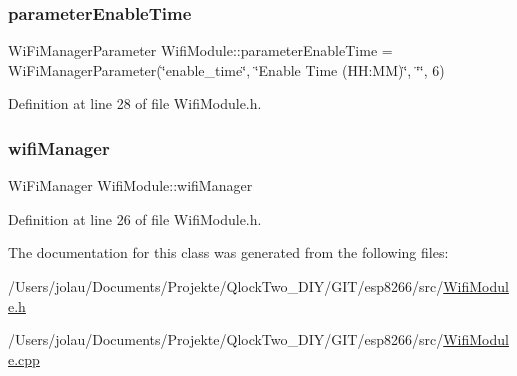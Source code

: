 \mbox{\label{class_wifi_module_ad138f4478faab934496f1b5679298261}} 
\subsubsection{\texorpdfstring{parameterEnableTime}{parameterEnableTime}}
{\footnotesize\ttfamily Wi\+Fi\+Manager\+Parameter Wifi\+Module\+::parameter\+Enable\+Time = Wi\+Fi\+Manager\+Parameter(\char`\"{}enable\+\_\+time\char`\"{}, \char`\"{}Enable Time (H\+H\+:\+MM)\char`\"{}, \char`\"{}\char`\"{}, 6)\hspace{0.3cm}{\ttfamily [private]}}



Definition at line 28 of file Wifi\+Module.\+h.

\mbox{\label{class_wifi_module_ad569429d746a3db2fe153e4cf063a07d}} 
\subsubsection{\texorpdfstring{wifiManager}{wifiManager}}
{\footnotesize\ttfamily Wi\+Fi\+Manager Wifi\+Module\+::wifi\+Manager\hspace{0.3cm}{\ttfamily [private]}}



Definition at line 26 of file Wifi\+Module.\+h.



The documentation for this class was generated from the following files\+:\begin{DoxyCompactItemize}
\item 
/\+Users/jolau/\+Documents/\+Projekte/\+Qlock\+Two\+\_\+\+D\+I\+Y/\+G\+I\+T/esp8266/src/\mbox{\hyperlink{_wifi_module_8h}{Wifi\+Module.\+h}}\item 
/\+Users/jolau/\+Documents/\+Projekte/\+Qlock\+Two\+\_\+\+D\+I\+Y/\+G\+I\+T/esp8266/src/\mbox{\hyperlink{_wifi_module_8cpp}{Wifi\+Module.\+cpp}}\end{DoxyCompactItemize}
